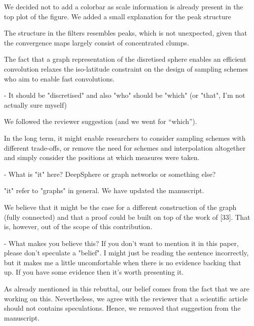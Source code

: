 \documentclass[12pt,a4paper]{article}
\newcommand{\nati}[1]{{\color[rgb]{.1,.6,.1}{NP: #1}}}
\newcommand{\TK}[1]{{\color{red}{TK: #1}}}
\newcommand{\todo}[1]{{\color[rgb]{.6,.1,.6}{TODO: #1}}}
\newcommand{\1}{\b{1}}              %
\newcommand{\0}{\b{0}}              %
\begin{document}
We decided not to add a colorbar as scale information is already present in the top plot of the figure.
We added a small explanation for the peak structure
\begin{mdframed}[style=manuscript]
The structure in the filters resembles peaks, which is not unexpected, given that the convergence maps largely consist of concentrated clumps.
\end{mdframed}

\begin{mdframed}[style=comment]
The fact that a graph representation of the disretised sphere enables an efficient convolution relaxes the iso-latitude constraint on the design of sampling schemes who aim to enable fast convolutions.

- It should be "discretised" and also "who" should be "which" (or "that", I'm not actually sure myself)
\end{mdframed}
We followed the reviewer suggestion (and we went for ``which'').

\begin{mdframed}[style=comment]
In the long term, it might enable researchers to consider sampling schemes with different trade-offs, or remove the need for schemes and interpolation altogether and simply consider the positions at which measures were taken.

- What is "it" here? DeepSphere or graph networks or something else?
\end{mdframed}
"it" refer to "graphs" in general. We have updated the manuscript.

\begin{mdframed}[style=comment]
We believe that it might be the case for a different construction of the graph (fully connected) and that a proof could be built on top of the work of [33]. That is, however, out of the scope of this contribution.

- What makes you believe this? If you don't want to mention it in this paper, please don't speculate a "belief". I might just be reading the sentence incorrectly, but it makes me a little uncomfortable when there is no evidence backing that up. If you have some evidence then it's worth presenting it.
\end{mdframed}
\todo{Assign: @nati, @michael}
As already mentioned in this rebuttal, our belief comes from the fact that we are working on this.
Nevertheless, we agree with the reviewer that a scientific article should not contains speculations.
Hence, we removed that suggestion from the manuscript.
\end{document}
